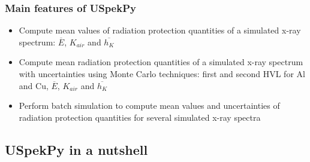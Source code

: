 \documentclass{beamer}
\newcommand{\highlight}[1]{{\color{blue} #1}}
\begin{document}
	\begin{frame}
		\frametitle{Main features of USpekPy}
		\begin{itemize}
			\setlength\itemsep{1em}
			\item Compute \highlight{mean values of radiation protection quantities} of a simulated x-ray spectrum: $\overline{E}$, $K_{air}$ and $\overline{h_K}$
			\item Compute \highlight{mean radiation protection quantities} of a simulated x-ray spectrum \highlight{with uncertainties} using Monte Carlo techniques: first and second HVL for Al and Cu, $\overline{E}$, $K_{air}$ and $\overline{h_K}$
			\item Perform \highlight{batch simulation} to compute mean values and uncertainties of radiation protection quantities for \highlight{several simulated x-ray spectra}
		\end{itemize}
	\end{frame}
	
	\subsection{USpekPy in a nutshell}
	
\end{document}
